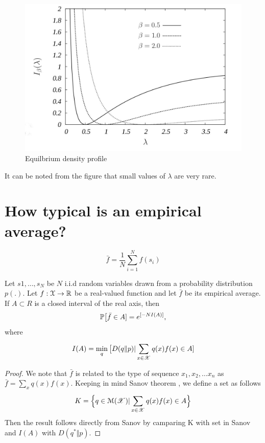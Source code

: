 \documentclass[letterpaper,english,12pt]{article}
\begin{document}
\begin{exmp}
 \begin{figure}[h!]
  \includegraphics[width=\linewidth]{EarthAtmo.jpeg}
  \caption{Equilbrium density profile}
  \label{fig:Earthatmo}
\end{figure}
It can be noted from the figure that small values of $\lambda$ are very rare.
 \end{exmp}
 \section{How typical is an empirical average?}
 \begin{equation}
     \bar{f} = \frac{1}{N}\sum_{i=1}^{N}f(s_i)
 \end{equation}
 \begin{cor}
 Let $s1,\dots ,s_N$ be $N$ i.i.d random variables drawn from a probability distribution $p(.)$. Let $f:\mathcal{X}\rightarrow \R$ be a real-valued  function and let $\bar{f}$ be its empirical average. If $A\subset R$ is a closed interval of the real axis, then 
 \begin{equation}
     \P\big[\bar{f}\in A]= e^{[-NI(A)]},
 \end{equation}
 where
 \begin{equation}
     I(A)=\min_q\big[D(q\Vert p)| \sum_{x\in \sX}^{} q(x)f(x) \in A]
 \end{equation}
 \end{cor}
 \begin{proof}
 We note that $\bar{f}$ is related to the type of sequence $x_1,x_2,\dots x_n$ as $\bar{f}=\sum_{x}^{}q(x)f(x)$. Keeping in mind Sanov theorem , we define a set as follows 
 \begin{equation}
     K= \Big\{ q\in \mathcal{M}(\sX)|\sum_{x\in \sX}^{} q(x)f(x) \in A \Big\}
 \end{equation}
 Then the result follows directly from Sanov by camparing K with set in Sanov and $I(A)$ with $D(q^* \Vert p)$.
 \end{proof}
 
\end{document}
